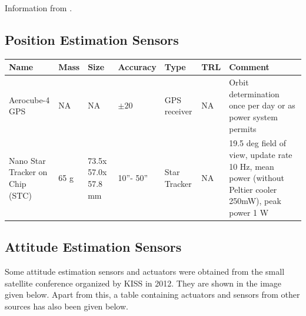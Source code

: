 
Information from \cite{imu2}.

\subsection{Position Estimation Sensors}
\begin{center}

     \begin{tabular}{ |p{2cm} | p{1cm} | p{2cm} | l | l | l | p{5cm} |}
     \hline

      {\bf Name} & {\bf Mass} & {\bf Size} & {\bf Accuracy} & {\bf Type} & {\bf TRL} & {\bf Comment}  \\ \hline

     Aerocube-4 GPS \cite{Gangestad} & NA & NA &  {$ \pm 20 $} & GPS receiver & NA & Orbit determination once per day or as power system permits \\ \hline

     Nano Star Tracker on Chip (STC) \cite{Prokhorov} & 65 g & 73.5x 57.0x 57.8 mm & 10''- 50'' & Star Tracker & NA & 19.5 deg field of view, update rate 10 Hz, mean power (without Peltier cooler 250mW), peak power 1 W \\ \hline
     \end{tabular}
\end{center}

\subsection{Attitude Estimation Sensors}
Some attitude estimation sensors and actuators were obtained from the small satellite conference organized by KISS in 2012. They are shown in the image given below.  Apart from this, a table containing actuators and sensors from other sources has also been given below. 

